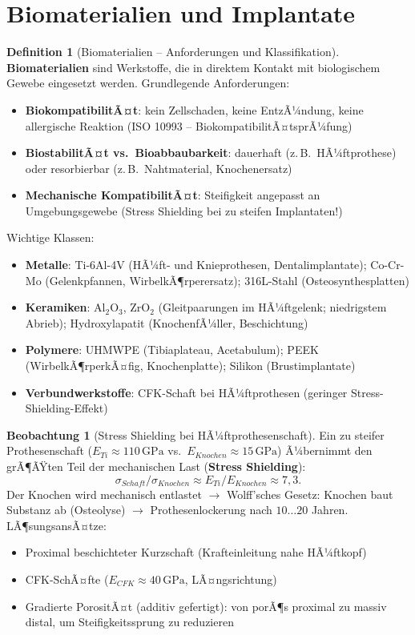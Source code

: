 ﻿\documentclass[a4paper,12pt]{report}
\theoremstyle{definition}
\newtheorem{definition}{Definition}
\newtheorem{beobachtung}{Beobachtung}
\begin{document}
\section{Biomaterialien und Implantate}

\begin{definition}[Biomaterialien -- Anforderungen und Klassifikation]
\textbf{Biomaterialien} sind Werkstoffe, die in direktem Kontakt mit
biologischem Gewebe eingesetzt werden. Grundlegende Anforderungen:
\begin{itemize}
    \item[-] \textbf{BiokompatibilitÃ¤t}: kein Zellschaden, keine EntzÃ¼ndung,
          keine allergische Reaktion (ISO 10993 -- BiokompatibilitÃ¤tsprÃ¼fung)
    \item[-] \textbf{BiostabilitÃ¤t vs.\ Bioabbaubarkeit}: dauerhaft
          (z.\,B.\ HÃ¼ftprothese) oder resorbierbar (z.\,B.\ Nahtmaterial, Knochenersatz)
    \item[-] \textbf{Mechanische KompatibilitÃ¤t}: Steifigkeit angepasst an
          Umgebungsgewebe (Stress Shielding bei zu steifen Implantaten!)
\end{itemize}
Wichtige Klassen:
\begin{itemize}
    \item[-] \textbf{Metalle}: Ti-6Al-4V (HÃ¼ft- und Knieprothesen, Dentalimplantate);
          Co-Cr-Mo (Gelenkpfannen, WirbelkÃ¶rperersatz); 316L-Stahl (Osteosynthesplatten)
    \item[-] \textbf{Keramiken}: $\mathrm{Al_2O_3}$, ZrO$_2$ (Gleitpaarungen im HÃ¼ftgelenk;
          niedrigstem Abrieb); Hydroxylapatit (KnochenfÃ¼ller, Beschichtung)
    \item[-] \textbf{Polymere}: UHMWPE (Tibiaplateau, Acetabulum);
          PEEK (WirbelkÃ¶rperkÃ¤fig, Knochenplatte); Silikon (Brustimplantate)
    \item[-] \textbf{Verbundwerkstoffe}: CFK-Schaft bei HÃ¼ftprothesen
          (geringer Stress-Shielding-Effekt)
\end{itemize}
\end{definition}

\begin{beobachtung}[Stress Shielding bei HÃ¼ftprothesenschaft]
Ein zu steifer Prothesenschaft ($E_{Ti} \approx 110\,\mathrm{GPa}$
vs.\ $E_{Knochen} \approx 15\,\mathrm{GPa}$) Ã¼bernimmt den grÃ¶ÃŸten Teil
der mechanischen Last (\textbf{Stress Shielding}):
\[
  \sigma_{Schaft}/\sigma_{Knochen} \approx E_{Ti}/E_{Knochen} \approx 7{,}3.
\]
Der Knochen wird mechanisch entlastet $\to$ Wolff'sches Gesetz:
Knochen baut Substanz ab (Osteolyse) $\to$ Prothesenlockerung nach $10\ldots20$ Jahren.
LÃ¶sungsansÃ¤tze:
\begin{itemize}
    \item[-] Proximal beschichteter Kurzschaft (Krafteinleitung nahe HÃ¼ftkopf)
    \item[-] CFK-SchÃ¤fte ($E_{CFK} \approx 40\,\mathrm{GPa}$, LÃ¤ngsrichtung)
    \item[-] Gradierte PorositÃ¤t (additiv gefertigt): von porÃ¶s proximal
          zu massiv distal, um Steifigkeitssprung zu reduzieren
\end{itemize}
\end{beobachtung}
\end{document}
